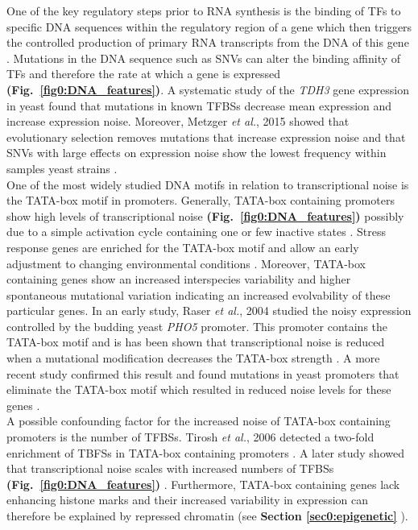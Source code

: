 One of the key regulatory steps prior to RNA synthesis is the binding of \glspl{TF} to specific DNA sequences within the regulatory region of a gene which then triggers the controlled production of primary RNA transcripts from the DNA of this gene \citep{Latchman1993}. Mutations in the DNA sequence such as \glspl{SNV} can alter the binding affinity of TFs and therefore the rate at which a gene is expressed \textbf{(Fig.~\ref{fig0:DNA_features})}. A systematic study of the \textit{\gls{TDH3}} gene expression in yeast found that mutations in known \glspl{TFBS} decrease mean expression and increase expression noise. Moreover, Metzger \textit{et al.}, 2015 showed that evolutionary selection removes mutations that increase expression noise and that SNVs with large effects on expression noise show the lowest frequency within samples yeast strains \citep{Metzger2015}. \\

One of the most widely studied DNA motifs in relation to transcriptional noise is the TATA-box motif in promoters. Generally, TATA-box containing promoters show high levels of transcriptional noise \textbf{(Fig.~\ref{fig0:DNA_features})} \citep{Faure2017} possibly due to a simple activation cycle containing one or few inactive states \citep{Zoller2015}. Stress response genes are enriched for the TATA-box motif and allow an early adjustment to changing environmental conditions \citep{Lopez-Maury2009}. Moreover, TATA-box containing genes show an increased interspecies variability \citep{Tirosh2006} and higher spontaneous mutational variation \citep{Landry2007} indicating an increased evolvability of these particular genes. In an early study, Raser \textit{et al.}, 2004 studied the noisy expression controlled by the budding yeast \textit{\gls{PHO5}} promoter. This promoter contains the TATA-box motif and is has been shown that transcriptional noise is reduced when a mutational modification decreases the TATA-box strength \citep{Raser2004}. A more recent study confirmed this result and found mutations in yeast promoters that eliminate the TATA-box motif which resulted in reduced noise levels for these genes \citep{Hornung2012}. \\

A possible confounding factor for the increased noise of TATA-box containing promoters is the number of TFBSs. Tirosh \textit{et al.}, 2006 detected a two-fold enrichment of TBFSs in TATA-box containing promoters \citep{Tirosh2006}. A later study showed that transcriptional noise scales with increased numbers of TFBSs \textbf{(Fig.~\ref{fig0:DNA_features})} \citep{Sharon2014}. Furthermore, TATA-box containing genes lack enhancing histone marks and their increased variability in expression can therefore be explained by repressed chromatin \citep{Choi2008} (see \textbf{Section \ref{sec0:epigenetic}} ).  \\

